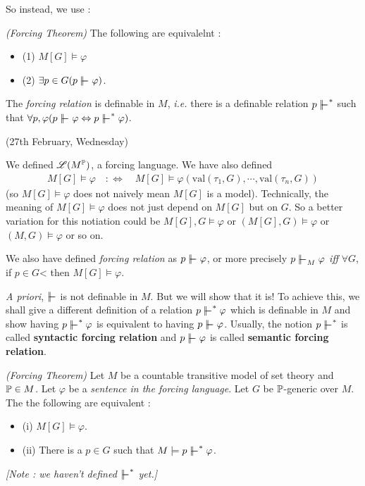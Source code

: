 \documentclass[12pt,a4paper]{article}
\renewenvironment{i}
{\begin{itemize} 
	}%
	{\end{itemize}
}
\begin{document}
So instead, we use :

\thm \emph{(Forcing Theorem)} The following are equivalelnt : 
\begin{i}
\item[(1)] $M[G] \models \varphi$
\item[(2)] $\exists p\in G (p\forces \varphi)$.
\end{i}
\s

\thm The \emph{forcing relation} is definable in $M$, \textit{i.e.} there is a definable relation $p\forces^*$ such that $\forall p, \varphi (p\forces \varphi \Leftrightarrow p\forces^* \varphi)$.
\s

\newday

(27th February, Wednesday)
\s

We defined $\mathscr{L}(M^{\mathbb{P}})$, a forcing language. We have also defined
\begin{align*}
M[G] \models \varphi \quad :\Leftrightarrow \quad M[G] \models \varphi( \text{val}(\tau_1, G), \cdots, \text{val}(\tau_n, G))
\end{align*}
(so $M[G] \models \varphi$ does not naively mean $M[G]$ is a model). Technically, the meaning of $M[G] \models \varphi$ does not just depend on $M[G]$ but on $G$. So a better variation for this notiation could be $M[G], G \models \varphi$ or $(M[G], G)\models \varphi$ or $(M, G) \models \varphi$ or so on.

\quad We also have defined \emph{forcing relation} as $p\forces \varphi$, or more precisely $p\forces_M\varphi$ \emph{iff} $\forall G$, if $p\in G$< then $M[G] \models \varphi$.

\quad \textit{A priori}, $\forces$ is not definable in $M$. But we will show that it is! To achieve this, we shall give a different definition of a relation $p\forces^* \varphi$ which is definable in $M$ and show having $p\forces^* \varphi$ is equivalent to having $p \forces \varphi$. Usually, the notion $p\forces^*$ is called \textbf{syntactic forcing relation} and $p\forces \varphi$ is called \textbf{semantic forcing relation}.
\s

\thm \emph{(Forcing Theorem)} Let $M$ be a countable transitive model of set theory and $\mathbb{P} \in M$. Let $\varphi$ be a \emph{sentence in the forcing language}. Let $G$ be $\mathbb{P}$-generic over $M$. The the following are equivalent :
\begin{i}
\item[(i)] $M[G] \models \varphi$.
\item[(ii)] There is a $p\in G$ such that $M\models p \forces^* \varphi$.
\end{i}
\emph{[Note : we haven't defined $\forces^*$ yet.]}
\s
\end{document}
